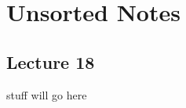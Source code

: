 \documentclass[../m171main.tex]{subfiles}
\begin{document}
\chapter{Unsorted Notes}
\section{Lecture 18}
stuff will go here
\end{document}
